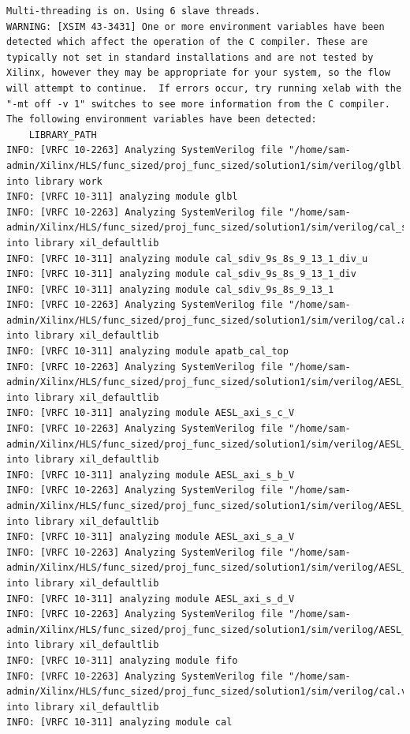 \documentclass{article}
\begin{document}
\begin{lstlisting}
Multi-threading is on. Using 6 slave threads.
WARNING: [XSIM 43-3431] One or more environment variables have been detected which affect the operation of the C compiler. These are typically not set in standard installations and are not tested by Xilinx, however they may be appropriate for your system, so the flow will attempt to continue.  If errors occur, try running xelab with the "-mt off -v 1" switches to see more information from the C compiler. The following environment variables have been detected:
    LIBRARY_PATH
INFO: [VRFC 10-2263] Analyzing SystemVerilog file "/home/sam-admin/Xilinx/HLS/func_sized/proj_func_sized/solution1/sim/verilog/glbl.v" into library work
INFO: [VRFC 10-311] analyzing module glbl
INFO: [VRFC 10-2263] Analyzing SystemVerilog file "/home/sam-admin/Xilinx/HLS/func_sized/proj_func_sized/solution1/sim/verilog/cal_sdiv_9s_8s_9_13_1.v" into library xil_defaultlib
INFO: [VRFC 10-311] analyzing module cal_sdiv_9s_8s_9_13_1_div_u
INFO: [VRFC 10-311] analyzing module cal_sdiv_9s_8s_9_13_1_div
INFO: [VRFC 10-311] analyzing module cal_sdiv_9s_8s_9_13_1
INFO: [VRFC 10-2263] Analyzing SystemVerilog file "/home/sam-admin/Xilinx/HLS/func_sized/proj_func_sized/solution1/sim/verilog/cal.autotb.v" into library xil_defaultlib
INFO: [VRFC 10-311] analyzing module apatb_cal_top
INFO: [VRFC 10-2263] Analyzing SystemVerilog file "/home/sam-admin/Xilinx/HLS/func_sized/proj_func_sized/solution1/sim/verilog/AESL_axi_s_c_V.v" into library xil_defaultlib
INFO: [VRFC 10-311] analyzing module AESL_axi_s_c_V
INFO: [VRFC 10-2263] Analyzing SystemVerilog file "/home/sam-admin/Xilinx/HLS/func_sized/proj_func_sized/solution1/sim/verilog/AESL_axi_s_b_V.v" into library xil_defaultlib
INFO: [VRFC 10-311] analyzing module AESL_axi_s_b_V
INFO: [VRFC 10-2263] Analyzing SystemVerilog file "/home/sam-admin/Xilinx/HLS/func_sized/proj_func_sized/solution1/sim/verilog/AESL_axi_s_a_V.v" into library xil_defaultlib
INFO: [VRFC 10-311] analyzing module AESL_axi_s_a_V
INFO: [VRFC 10-2263] Analyzing SystemVerilog file "/home/sam-admin/Xilinx/HLS/func_sized/proj_func_sized/solution1/sim/verilog/AESL_axi_s_d_V.v" into library xil_defaultlib
INFO: [VRFC 10-311] analyzing module AESL_axi_s_d_V
INFO: [VRFC 10-2263] Analyzing SystemVerilog file "/home/sam-admin/Xilinx/HLS/func_sized/proj_func_sized/solution1/sim/verilog/AESL_fifo.v" into library xil_defaultlib
INFO: [VRFC 10-311] analyzing module fifo
INFO: [VRFC 10-2263] Analyzing SystemVerilog file "/home/sam-admin/Xilinx/HLS/func_sized/proj_func_sized/solution1/sim/verilog/cal.v" into library xil_defaultlib
INFO: [VRFC 10-311] analyzing module cal

\end{lstlisting}
\end{document}
